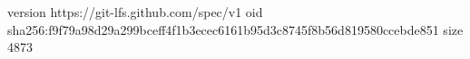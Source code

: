 version https://git-lfs.github.com/spec/v1
oid sha256:f9f79a98d29a299bceff4f1b3ecec6161b95d3c8745f8b56d819580ccebde851
size 4873
